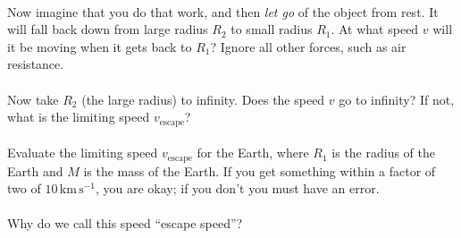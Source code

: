 \documentclass[12pt]{article}
\newcommand{\km}{\mathrm{km}}
\newcommand{\s}{\mathrm{s}}
\newcounter{problem}
\begin{document}
\paragraph{\theproblem}%
Now imagine that you do that work, and then \emph{let go} of the
object from rest.  It will fall back down from large radius $R_2$ to
small radius $R_1$.  At what speed $v$ will it be moving when it gets
back to $R_1$?  Ignore all other forces, such as air resistance.

\paragraph{\theproblem}%
Now take $R_2$ (the large radius) to infinity.  Does the speed $v$ go
to infinity?  If not, what is the limiting speed $v_\mathrm{escape}$?

\paragraph{\theproblem}%
Evaluate the limiting speed $v_\mathrm{escape}$ for the Earth, where
$R_1$ is the radius of the Earth and $M$ is the mass of the Earth.  If
you get something within a factor of two of $10\,\km\,\s^{-1}$, you
are okay; if you don't you must have an error.

\paragraph{\theproblem}%
Why do we call this speed ``escape speed''?
\end{document}
